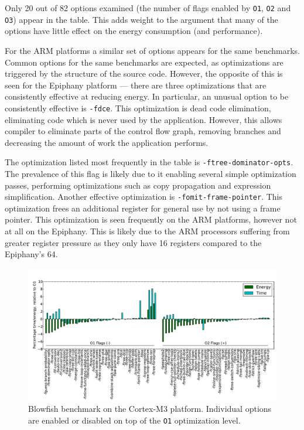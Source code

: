 \documentclass[twocolumn]{article}
\let\oldcaption\caption
\renewcommand{\caption}[1]{\oldcaption{\textup{#1}}}
\begin{document}
Only 20 out of 82 options examined (the number of flags enabled by \texttt{O1}, \texttt{O2} and \texttt{O3}) appear in the table. This adds weight to the argument that many of the options have little effect on the energy consumption (and performance).

For the ARM platforms a similar set of options appears for the same benchmarks. Common options for the same benchmarks are expected, as optimizations are triggered by the structure of the source code. However, the opposite of this is seen for the Epiphany platform --- there are three optimizations that are consistently effective at reducing energy. In particular, an unusual option to be consistently effective is \texttt{-fdce}. This optimization is dead code elimination, eliminating code which is never used by the application. However, this allows compiler to eliminate parts of the control flow graph, removing branches and decreasing the amount of work the application performs.

The optimization listed most frequently in the table is \texttt{-ftree-dominator-opts}. The prevalence of this flag is likely due to it enabling several simple optimization passes, performing optimizations such as copy propagation and expression simplification. Another effective optimization is \texttt{-fomit-frame-pointer}. This optimization frees an additional register for general use by not using a frame pointer. This optimization is seen frequently on the ARM platforms, however not at all on the Epiphany. This is likely due to the ARM processors suffering from greater register pressure as they only have 16 registers compared to the Epiphany's 64.

\begin{figure}[t!h]
	\includegraphics[width=\linewidth,clip,trim=0.5cm 0.1cm 0cm 1.8cm]{cortex-m3/O1_addsub_blowfish.pdf}
	\caption{Blowfish benchmark on the Cortex-M3 platform. Individual options are enabled or disabled on top of the \texttt{O1} optimization level.}
	\label{Fig:AddsubO1Blowfish}
\end{figure}
\end{document}

